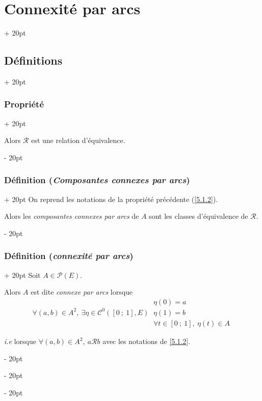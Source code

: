 \documentclass[a4paper, 12pt, twoside]{article}
\newcommand{\seg}[2]{\left[ #1\ ;\ #2 \right]}
\newcommand{\lr}[1]{\left( #1 \right)}
\newcommand{\ind}[1][20pt]{\advance\leftskip + #1}
\newcommand{\deind}[1][20pt]{\advance\leftskip - #1}
\newenvironment{indt}[2][20pt]{#2 \par \ind[#1]}{\par \deind} %
\begin{document}
\begin{indt}{\section{Connexité par arcs}}
\begin{indt}{\subsection{Définitions}}
\begin{indt}{\subsubsection{Propriété}}
                \vspace{12pt}
                
                Alors $\mathcal R$ est une relation d'équivalence.
            \end{indt}

            \vspace{12pt}
            
            \begin{indt}{\subsubsection{Définition (\textit{Composantes connexes par arcs})}}
                On reprend les notations de la propriété précédente (\ref{5.1.2}).

                \vspace{6pt}
                
                Alors les \emph{composantes connexes par arcs} de $A$ sont les classes d'équivalence de $\mathcal R$.
            \end{indt}

            \vspace{12pt}
            
            \begin{indt}{\subsubsection{Définition (\textit{connexité par arcs})}}
                Soit $A \in \mathcal P(E)$.

                Alors $A$ est dite \emph{connexe par arcs} lorsque
                \[
                    \forall (a, b) \in A^2,\
                    \exists \eta \in \mathcal C^0\!\lr{\seg 0 1, E}\
                    \begin{array}{|l}
                        \eta(0) = a
                        \\
                        \eta(1) = b
                        \\
                        \forall t \in \seg 0 1,\ \eta(t) \in A
                    \end{array}
                \]

                \textit{i.e} lorsque $\forall (a, b) \in A^2,\ a \mathcal R b$ avec les notations de \ref{5.1.2}.

                \vspace{12pt}
                

\end{indt}
\end{indt}
\end{indt}
\end{document}
